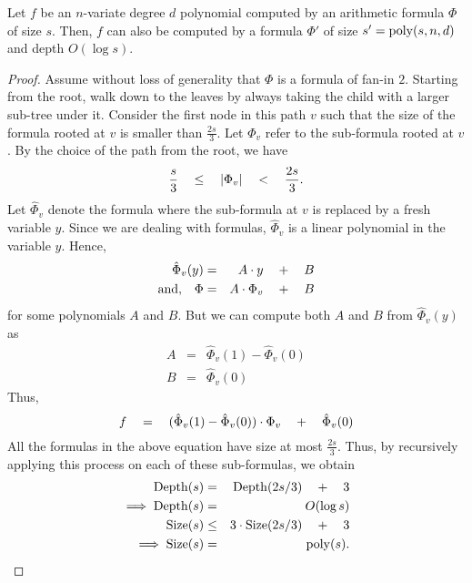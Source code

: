 \begin{lemma}\label{lem:formula-depth-reduction}
Let $f$ be an $n$-variate degree $d$ polynomial computed by an arithmetic formula $\Phi$ of size $s$. Then, $f$ can also be computed by a formula $\Phi'$ of size $s' = \mathrm{poly}(s,n,d)$ and depth $O(\log s)$. 
\end{lemma}
\begin{proof}
Assume without loss of generality that $\Phi$ is a formula of fan-in $2$. Starting from the root, walk down to the leaves by always taking the child with a larger sub-tree under it. Consider the first node in this path $v$ such that the size of the formula rooted at $v$ is smaller than $\frac{2s}{3}$. Let $\Phi_v$ refer to the sub-formula rooted at $v$. By the choice of the path from the root, we have
\[
\frac{s}{3} \quad \leq \quad \left|\Phi_v\right| \quad < \quad \frac{2s}{3}.
\]
Let $\hat{\Phi}_v$ denote the formula where the sub-formula at $v$ is replaced by a fresh variable $y$. Since we are dealing with formulas, $\hat{\Phi}_v$ is a linear polynomial in the variable $y$. Hence,
\begin{eqnarray*}
\hat{\Phi}_v(y) & = & A \cdot y \quad + \quad B\\
\text{and,}\quad \Phi & = & A \cdot \Phi_v \quad + \quad B
\end{eqnarray*}
for some polynomials $A$ and $B$. But we can compute both $A$ and $B$ from $\hat{\Phi}_v(y)$ as
\begin{eqnarray*}
A & = & \hat{\Phi}_v(1) - \hat{\Phi}_v(0)\\
B & = & \hat{\Phi}_v(0)
\end{eqnarray*}
Thus, 
\[
f \quad = \quad (\hat{\Phi}_v(1) - \hat{\Phi}_v(0))\cdot \Phi_v \quad + \quad \hat{\Phi}_v(0)
\]
All the formulas in the above equation have size at most $\frac{2s}{3}$. Thus, by recursively applying this process on each of these sub-formulas, we obtain
\begin{eqnarray*}
\mathrm{Depth}(s) & = & \mathrm{Depth}(2s/3) \quad + \quad 3\\
\implies \mathrm{Depth}(s) &=& O(\log s)\\
\mathrm{Size}(s) & \leq & 3\cdot \mathrm{Size}(2s/3) \quad + \quad 3\\
\implies \mathrm{Size}(s) &=& \mathrm{poly}(s).
\end{eqnarray*}
\end{proof}

